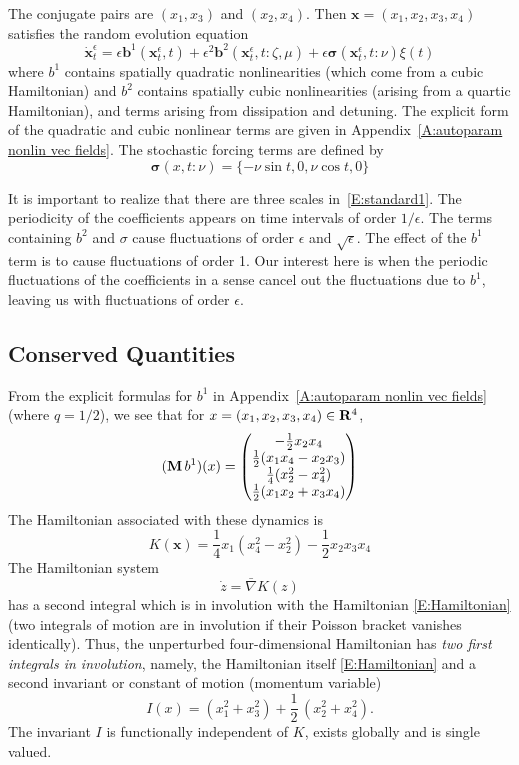 The conjugate pairs are $(x_1,x_3)$ and $(x_2,x_4)$. Then $\boldsymbol x = (x_1,x_2,x_3,x_4)$ satisfies the random evolution equation
\begin{equation}
\dot{\bm x}^\epsilon_t = \epsilon \bm b^1(\bm x^\epsilon_t,t) + \epsilon^2 \bm b^2(\bm x^\epsilon_t,t:\zeta,\mu) + \epsilon \bm \sigma(\bm x^\epsilon_t, t: \nu) \xi(t)
\label{E:standard1}
\end{equation}
where $b^1$ contains spatially quadratic nonlinearities (which come from a cubic Hamiltonian) and $b^2$ contains spatially cubic nonlinearities (arising from a quartic Hamiltonian), and terms arising from dissipation and detuning. The explicit form of the quadratic and cubic nonlinear terms are given in Appendix~\ref{A:autoparam nonlin vec fields}. The stochastic forcing terms are defined by
\[
\bm \sigma(x,t:\nu) = \{-\nu \sin t, 0, \nu \cos t, 0\}
\]

It is important to realize that there are three scales in~\eqref{E:standard1}. The periodicity of the coefficients appears on time intervals of order $1/\epsilon$. The terms containing $b^2$ and $\sigma$ cause fluctuations of order $\epsilon$ and $\sqrt{\epsilon}$. The effect of the $b^1$ term is to cause fluctuations of order 1. Our interest here is when the periodic fluctuations of the coefficients in a sense cancel out the fluctuations due to $b^1$, leaving us with fluctuations of order $\epsilon$.

\subsection{Conserved Quantities}
\label{S:averagedequations}

From the explicit formulas for $b^1$ in Appendix~\ref{A:autoparam nonlin vec fields} (where $q=1/2$), we see that for $x = (x_1,x_2,x_3,x_4) \in \mathbf R^4$,
\[
(\operatorname{\mathbf M} b^1)(x) =
\begin{pmatrix}
-\frac12 x_2x_4 \\
\frac12 (x_1 x_4 - x_2 x_3)\\
\frac14 (x_2^2-x_4^2)\\
\frac12 (x_1 x_2 + x_3 x_4)
\end{pmatrix}
\]
The Hamiltonian associated with these dynamics is
\begin{equation}
\label{E:Hamiltonian}
K(\boldsymbol x) = \frac14 x_1(x_4^2 - x_2^2) - \frac12 x_2 x_3 x_4
\end{equation}
The Hamiltonian system
\begin{equation}
\label{E:flow}
\dot{z} = \bar{\nabla} K(z)
\end{equation}
has a second integral which is in involution with the Hamiltonian \eqref{E:Hamiltonian} (two integrals of motion are in involution if their Poisson bracket vanishes identically). Thus, the unperturbed four-dimensional Hamiltonian has \emph{two first integrals in involution}, namely, the Hamiltonian itself \eqref{E:Hamiltonian} and a second invariant or constant of motion (momentum variable)
\begin{equation}
\label{E:momentum}
I(x)=(x_1^2+x_3^2)+\frac12\,(x_2^2+x_4^2).
\end{equation}
The invariant $I$ is functionally independent of $K$, exists globally and is single valued. 

